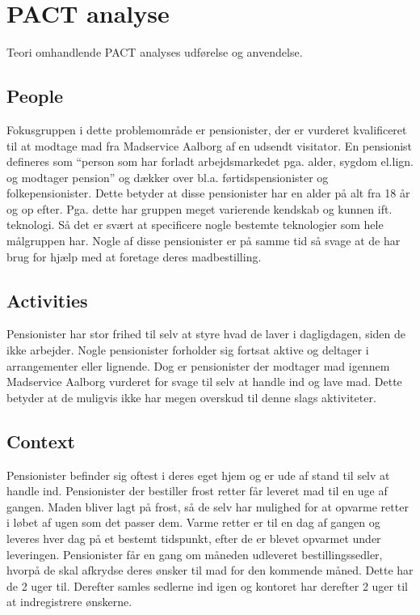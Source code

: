 \section{PACT analyse}
Teori omhandlende PACT analyses udførelse og anvendelse.

\subsection{People}
Fokusgruppen i dette problemområde er pensionister, der er vurderet kvalificeret til at modtage mad fra Madservice Aalborg af en udsendt visitator.
En pensionist defineres som ``person som har forladt arbejdsmarkedet pga. alder, sygdom el.lign. og modtager pension'' og dækker over bl.a. førtidspensionister og folkepensionister\cite{ordnet_pensionist}.
Dette betyder at disse pensionister har en alder på alt fra 18 år og op efter.
Pga. dette har gruppen meget varierende kendskab og kunnen ift. teknologi.
Så det er svært at specificere nogle bestemte teknologier som hele målgruppen har.
Nogle af disse pensionister er på samme tid så svage at de har brug for hjælp med at foretage deres madbestilling.

\subsection{Activities}
Pensionister har stor frihed til selv at styre hvad de laver i dagligdagen, siden de ikke arbejder.
Nogle pensionister forholder sig fortsat aktive og deltager i arrangementer eller lignende.
Dog er pensionister der modtager mad igennem Madservice Aalborg vurderet for svage til selv at handle ind og lave mad.
Dette betyder at de muligvis ikke har megen overskud til denne slags aktiviteter.

\subsection{Context}
Pensionister befinder sig oftest i deres eget hjem og er ude af stand til selv at handle ind. 
Pensionister der bestiller frost retter får leveret mad til en uge af gangen.
Maden bliver lagt på frost, så de selv har mulighed for at opvarme retter i løbet af ugen som det passer dem.
Varme retter er til en dag af gangen og leveres hver dag på et bestemt tidspunkt, efter de er blevet opvarmet under leveringen. 
Pensionister får en gang om måneden udleveret bestillingssedler, hvorpå de skal afkrydse deres ønsker til mad for den kommende måned.
Dette har de 2 uger til.
Derefter samles sedlerne ind igen og kontoret har derefter 2 uger til at indregistrere ønskerne.

